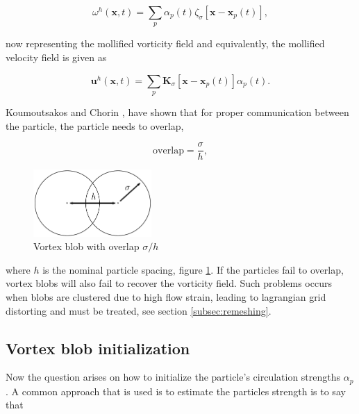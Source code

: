	\begin{equation}
	\omega^h\left(\mathbf{x},t\right) = \sum_p \alpha_p\left(t\right)\zeta_{\sigma}\left[\mathbf{x}-\mathbf{x}_p\left(t\right)\right],
	\label{eq:mollifiedVorticityField}
	\end{equation}

now representing the mollified vorticity field and equivalently, the mollified velocity field is given as

	\begin{equation}
	\mathbf{u}^h\left(\mathbf{x},t\right) = \sum_p \mathbf{K}_{\sigma}\left[\mathbf{x}-\mathbf{x}_p\left(t\right)\right]\alpha_p\left(t\right).
	\end{equation}

Koumoutsakos and Chorin \cite{Cottet2000a}, have shown that for proper communication between the particle, the particle needs to overlap,

	\begin{equation}
	\mathrm{overlap} = \frac{\sigma}{h},
	\label{eq:overlapRatio}
	\end{equation}

	\begin{figure}[t]
	\centering
	\includegraphics[width=0.4\textwidth]{figures/lagrangian/blobOverlap.pdf}
	\caption{Vortex blob with overlap $\sigma/h$}
	\label{fig:blobOverlap}
	\end{figure}

	
where $h$ is the nominal particle spacing, figure \ref{fig:blobOverlap}. If the particles fail to overlap, vortex blobs will also fail to recover the vorticity field. Such problems occurs when blobs are clustered due to high flow strain, leading to lagrangian grid distorting and must be treated, see section \ref{subsec:remeshing}.


\subsection{Vortex blob initialization}
\label{subsec:vortexBlobInitialization}
Now the question arises on how to initialize the particle's circulation strengths $\alpha_p$. A common approach that is used is to estimate the particles strength is to say that

